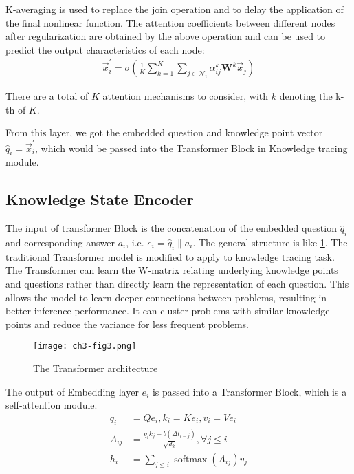 K-averaging is used to replace the join operation and to delay the application of the final nonlinear function. The attention coefficients between different nodes after regularization are obtained by the above operation and can be used to predict the output characteristics of each node:
\begin{align}
	\vec{x}_{i}^{\prime}=\sigma(\frac{1}{K} \sum_{k=1}^{K} \sum_{j \in \mathcal{N}_{i}} \alpha_{i j}^{k} \mathbf{W}^{k} \vec{x}_{j})
\end{align}

There are a total of \(K\) attention mechanisms to consider, with \(k\) denoting the k-th of \(K\).


From this layer, we got the embedded question and knowledge point vector \(\hat{q}_{i} =  \vec{x}_{i}^{\prime}\), which would be passed into the Transformer Block in Knowledge tracing module.

\subsection{Knowledge State Encoder}
The input of transformer Block is the concatenation of the embedded question \(\hat{q}_{i}\) and corresponding answer \(a_i\), i.e. \(e_i=\hat{q}_{i}\|a_i\). The general structure is like \figurename{\ref{fig:ch3-fig5}}. The traditional Transformer model is modified to apply to knowledge tracing task. The Transformer can learn the W-matrix relating underlying knowledge points and questions rather than directly learn the representation of each question. This allows the model to learn deeper connections between problems, resulting in better inference performance. It can cluster problems with similar knowledge points and reduce the variance for less frequent problems.
\begin{figure}[htbp!]
	\centering
	\texttt{[image: ch3-fig3.png]}
	\caption{The Transformer architecture}
	\label{fig:ch3-fig5}
\end{figure}

The output of Embedding layer \(e_i\) is passed into a Transformer Block, which is a self-attention module.
\begin{align}
	q_{i}   & =Q e_{i}, k_{i}=K e_{i}, v_{i}=V e_{i}                                \\
	A_{i j} & =\frac{q_{i} k_{j}+b(\Delta t_{i-j})}{\sqrt{d_{k}}}, \forall j \leq i \\
	h_{i}   & =\sum_{j \leq i} \operatorname{softmax}(A_{i j}) v_{j}
\end{align}

